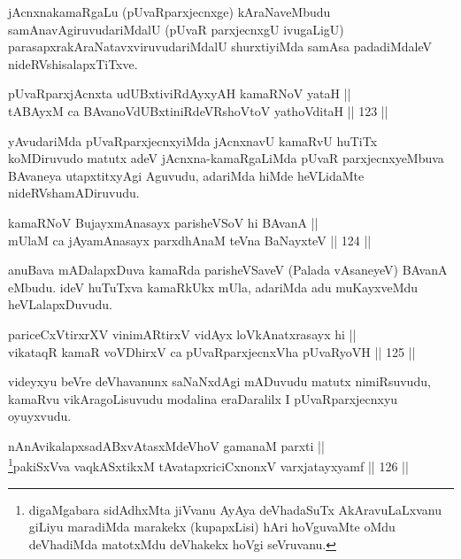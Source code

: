 \begin{artha}
jAcnxnakamaRgaLu (pUvaRparxjecnxge) kAraNaveMbudu
samAnavAgiruvudariMdalU (pUvaR parxjecnxgU ivugaLigU)
parasapxrakAraNatavxviruvudariMdalU shurxtiyiMda samAsa padadiMdaleV
nideRVshisalapxTiTxve.
\end{artha}

\begin{shl}
pUvaRparxjAcnxta udUBxtiviRdAyxyAH kamaRNoV yataH || \\
tABAyxM ca BAvanoVdUBxtiniRdeVRshoV\s toV yathoVditaH \hfill || 123 ||  
\end{shl}

\begin{artha}
yAvudariMda pUvaRparxjecnxyiMda jAcnxnavU kamaRvU huTiTx koMDiruvudo
matutx adeV jAcnxna-kamaRgaLiMda pUvaR parxjecnxyeMbuva BAvaneya
utapxtitxyAgi Aguvudu, adariMda hiMde heVLidaMte nideRVshamADiruvudu.
\end{artha}


\begin{shl}
kamaRNoV BujayxmAnasayx parisheVSoV hi BAvanA || \\
mUlaM ca jAyamAnasayx parxdhAnaM teVna BaNayxteV \hfill || 124 ||  
\end{shl}

\begin{artha}
anuBava mADalapxDuva kamaRda parisheVSaveV (Palada vAsaneyeV) BAvanA
eMbudu. ideV huTuTxva kamaRkUkx mUla, adariMda adu muKayxveMdu
heVLalapxDuvudu.
\end{artha}

\begin{shl}
pariceCxVtirxrXV vinimARtirxV vidAyx loVkAnatxrasayx hi || \\
vikataqR kamaR voVDhirxV ca pUvaRparxjecnxVha pUvaRyoVH \hfill || 125 ||  
\end{shl}	

\begin{artha}
videyxyu beVre deVhavanunx saNaNxdAgi mADuvudu matutx nimiRsuvudu,
kamaRvu vikAragoLisuvudu  modalina eraDaralilx I pUvaRparxjecnxyu
oyuyxvudu.
\end{artha}


\begin{shl}
nAnAvikalapxsadABxvAtasxMdeVhoV gamanaM parxti || \\
\footnote{digaMgabara sidAdhxMta jiVvanu AyAya deVhadaSuTx
AkAravuLaLxvanu giLiyu maradiMda marakekx (kupapxLisi) hAri
hoVguvaMte oMdu deVhadiMda matotxMdu deVhakekx hoVgi seVruvanu.}pakiSxVva vaqkASxtikxM tAvatapxriciCxnonxV varxjatayxyamf \hfill || 126 ||  
\end{shl}


